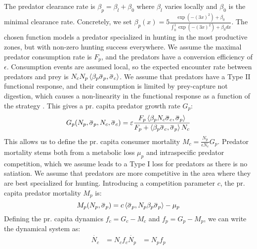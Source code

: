The predator clearance rate is $\beta_p = \beta_{l} + \beta_0$ where $\beta_l$ varies locally and $\beta_0$ is the minimal clearance rate. Concretely, we set $\beta_p(x) = 5 \frac{\exp(-(3 x)^2) + \beta_0}{\int_0^1 \exp(-(3 x)^2) + \beta_0 dx}$. The chosen function models a predator specialized in hunting in the most productive zones, but with non-zero hunting success everywhere. We assume the maximal predator consumption rate is $F_p$, and the predators have a conversion efficiency of $\epsilon$. Consumption events are assumed local, so the expected encounter rate between predators and prey is $N_c N_p \ip{\beta_p \overbar{\sigma}_p}{\overbar{\sigma}_c}$. We assume that predators have a Type II functional response, and their consumption is limited by prey-capture not digestion, which causes a non-linearity in the functional response as a function of the strategy \citep{Kioerboe2018}. This gives a pr. capita predator growth rate $G_p$:
\begin{equation}
  G_p(N_p, \overbar{\sigma}_p, N_c, \overbar{\sigma}_c )= \epsilon\frac{F_p \ip{\beta_p N_c\overbar{\sigma}_c}{\overbar{\sigma}_p} }{F_p + \ip{\beta_p \overbar{\sigma}_c}{\overbar{\sigma}_p} N_c}
\end{equation}
This allows us to define the pr. capita consumer mortality $M_c = \frac{N_p}{\epsilon N_c}G_p$. Predator mortality stems both from a metabolic loss $\mu_p$ and intraspecific predator competition, which we assume leads to a Type I loss for predators as there is no satiation. We assume that predators are more competitive in the area where they are best specialized for hunting. Introducing a competition parameter $c$, the pr. capita predator mortality $M_p$ is:
\begin{equation}
  M_p(N_p, \overbar{\sigma}_p) =  c \ip{\overbar{\sigma}_p}{N_p\beta_p \overbar{\sigma}_p}  - \mu_p
\end{equation}
Defining the pr. capita dynamics $f_c = G_c - M_c$ and $f_p = G_p - M_p$, we can write the dynamical system as:
\begin{align}
  \dot{N_c} &= N_c f_c
  \dot{N_p} &= N_p f_p
  \label{eq:dynamics}
\end{align}

